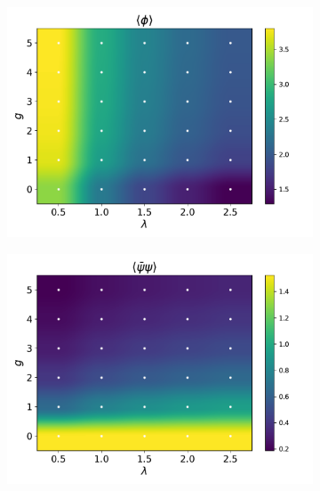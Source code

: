 \begin{figure}[htp]
    \centering
    \begin{subfigure}[b]{0.47\textwidth}
        \includegraphics[width=\textwidth]{figures/phase_diagram/g-lam/phase_diagram_phi.pdf}
    \end{subfigure}
    \begin{subfigure}[b]{0.47\textwidth}
        \includegraphics[width=\textwidth]{figures/phase_diagram/g-lam/phase_diagram_cond.pdf}
    \end{subfigure}
    \begin{subfigure}[b]{0.47\textwidth}

\end{subfigure}
\end{figure}
